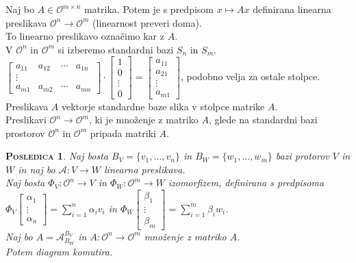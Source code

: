 \documentclass[a4paper,12pt]{article}
\newcommand{\OO}{\mathcal{O}}
\newtheorem*{posledica}{\textsc{Posledica}}
\begin{document}
Naj bo $A\in \mathcal{O}^{m\times n}$ matrika. Potem je s predpisom $x\mapsto Ax$ definirana linearna preslikava $\OO^n\to \mathcal{O}^m$ (linearnost preveri doma). \\

To linearno preslikavo označimo kar z $A$. \\

V $\mathcal{O} ^n$ in $\mathcal{O}^m$ si izberemo standardni bazi $S_n$ in $S_m$. \\

$\begin{bmatrix}
	a_{11} & a_{12} & \cdots & a_{1n} \\
	\vdots & & & \\
	a_{m1} & a_{m2} & \cdots & a_{mn} 
\end{bmatrix} \cdot 
\begin{bmatrix}
	1 \\
	0 \\
	\vdots \\
	0
\end{bmatrix} =
\begin{bmatrix}
	a_{11} \\
	a_{21} \\
	\vdots \\
	a_{m1}
\end{bmatrix}$, podobno velja za ostale stolpce. \\

Preslikava $A$ vektorje standardne baze slika v stolpce matrike $A$. \\

Preslikavi $\OO^n\to \mathcal{O}^m$, ki je množenje z matriko $A$, glede na standardni bazi prostorov $\mathcal{O} ^n$ in $\mathcal{O}^m$ pripada matriki $A$. \\

\newpage 

\begin{posledica}
	Naj bosta $B_V=\{v_1,\ldots,v_n\}$ in $B_W=\{w_1,\ldots,w_m\}$ bazi protorov $V$ in $W$ in naj bo $\mathcal{A}:V\to W$ linearna preslikava. \\

Naj bosta $\Phi_V:\OO^n\to V$ in $\Phi_W:\mathcal{O}^m\to W$ izomorfizem, definirana s predpisoma \linebreak  $\Phi_V \begin{bmatrix} \alpha_1 \\ \vdots \\ \alpha_n \end{bmatrix}=\sum_{i=1}^n \alpha_i v_i$ in $\Phi_W \begin{bmatrix} \beta_1 \\ \vdots \\ \beta_m \end{bmatrix} = \sum_{i=1}^m \beta_i w_i$. \\

	Naj bo $A=\mathcal{A}_{B_W}^{B_V}$ in $A:\OO^n\to \mathcal{O}^m$ množenje z matriko $A$. \\

	Potem diagram \Smiley{} komutira.\\
\end{posledica}
\end{document}
